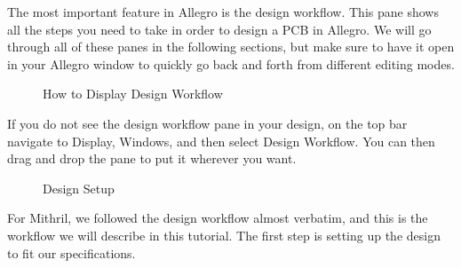 The most important feature in Allegro is the design workflow. This pane shows all the steps you need to take in order to design a PCB
in Allegro. We will go through all of these panes in the following sections, but make sure to have it open in your Allegro window to quickly
go back and forth from different editing modes.

\begin{figure}[H]
  \centering
\caption{How to Display Design Workflow}
\label{img:workflowTab}
\end{figure}

If you do not see the design workflow pane in your design, on the top bar navigate to Display, Windows, and then select Design Workflow. You can then drag
and drop the pane to put it wherever you want.

\begin{figure}[H]
  \centering
\caption{Design Setup}
\label{img:setupPane}
\end{figure}

For Mithril, we followed the design workflow almost verbatim, and this is the workflow we will describe in this tutorial. The first step
is setting up the design to fit our specifications. 

